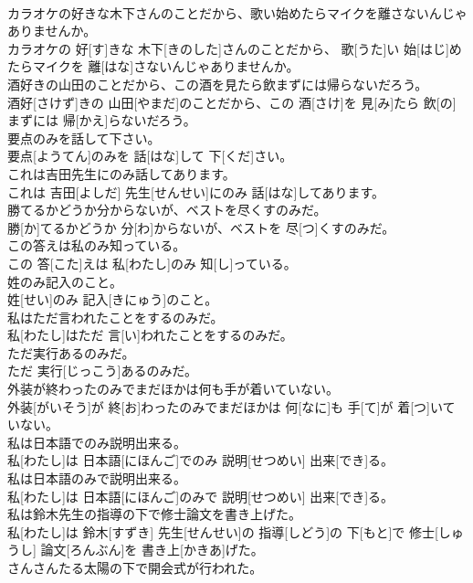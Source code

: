 \documentclass[8pt]{extreport}
\begin{document}
\begin{CJK}{UTF8}{min}
\\	カラオケの好きな木下さんのことだから、歌い始めたらマイクを離さないんじゃありませんか。	
\\	カラオケの 好[す]きな 木下[きのした]さんのことだから、 歌[うた]い 始[はじ]めたらマイクを 離[はな]さないんじゃありませんか。
\\	酒好きの山田のことだから、この酒を見たら飲まずには帰らないだろう。	
\\	酒好[さけず]きの 山田[やまだ]のことだから、この 酒[さけ]を 見[み]たら 飲[の]まずには 帰[かえ]らないだろう。
\\	要点のみを話して下さい。	
\\	要点[ようてん]のみを 話[はな]して 下[くだ]さい。
\\	これは吉田先生にのみ話してあります。	
\\	これは 吉田[よしだ] 先生[せんせい]にのみ 話[はな]してあります。
\\	勝てるかどうか分からないが、ベストを尽くすのみだ。	
\\	勝[か]てるかどうか 分[わ]からないが、ベストを 尽[つ]くすのみだ。
\\	この答えは私のみ知っている。	
\\	この 答[こた]えは 私[わたし]のみ 知[し]っている。
\\	姓のみ記入のこと。	
\\	姓[せい]のみ 記入[きにゅう]のこと。
\\	私はただ言われたことをするのみだ。	
\\	私[わたし]はただ 言[い]われたことをするのみだ。
\\	ただ実行あるのみだ。	
\\	ただ 実行[じっこう]あるのみだ。
\\	外装が終わったのみでまだほかは何も手が着いていない。	
\\	外装[がいそう]が 終[お]わったのみでまだほかは 何[なに]も 手[て]が 着[つ]いていない。
\\	私は日本語でのみ説明出来る。	
\\	私[わたし]は 日本語[にほんご]でのみ 説明[せつめい] 出来[でき]る。
\\	私は日本語のみで説明出来る。	
\\	私[わたし]は 日本語[にほんご]のみで 説明[せつめい] 出来[でき]る。
\\	私は鈴木先生の指導の下で修士論文を書き上げた。	
\\	私[わたし]は 鈴木[すずき] 先生[せんせい]の 指導[しどう]の 下[もと]で 修士[しゅうし] 論文[ろんぶん]を 書き上[かきあ]げた。
\\	さんさんたる太陽の下で開会式が行われた。	

\end{CJK}
\end{document}
